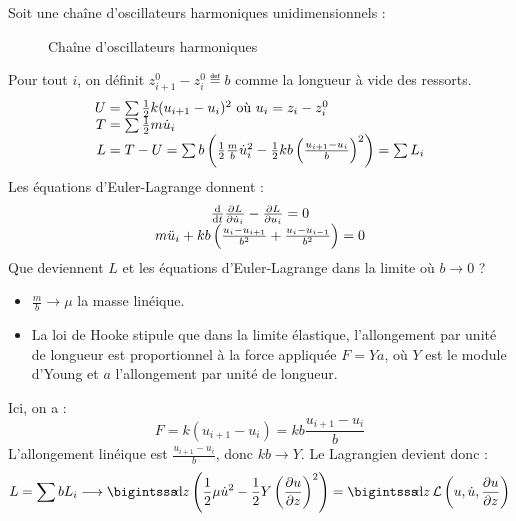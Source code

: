 Soit une cha\^ine d'oscillateurs harmoniques unidimensionnels :
\begin{figure}[H]
\centering
{}
\caption*{Chaîne d'oscillateurs harmoniques}
\end{figure}

Pour tout $i$, on définit $z_{i+1}^0-z_i^0\eqdef b$ comme la longueur à vide des ressorts.
$$
	\begin{array}{r@{\;}l}
		U&=\sum \frac{1}{2}k(u_{i+1}-u_i)^2 \text{ où } u_i=z_i-z_i^0\\
		T&=\sum \frac{1}{2}m\dot{u}_i\\
		L&=T-U=\sum b\left(\frac{1}{2}\frac{m}{b}\dot{u}_i^2-\frac{1}{2}kb\left(\frac{u_{i+1}-u_i}{b}\right)^2\right)=\sum L_i
	\end{array}
$$
Les équations d'Euler-Lagrange donnent :
$$
	\begin{array}{c}
		\frac{\mathrm{d} }{\mathrm{d} t}\frac{\partial L}{\partial \dot{u}_i}-\frac{\partial L}{\partial u_i}=0\\
		m\ddot{u}_i+kb\left(\frac{u_i-u_{i+1}}{b^2}+\frac{u_i-u_{i-1}}{b^2}\right)=0
	\end{array}
$$
Que deviennent $L$ et les équations d'Euler-Lagrange dans la limite où $b\longrightarrow 0$ ?
\begin{itemize}
	\item $\frac{m}{b}\longrightarrow \mu$ la masse linéique.
	\item La loi de Hooke stipule que dans la limite élastique, l'allongement par unité de longueur est proportionnel à la force appliquée $F=Ya$, où $Y$ est le module d'Young et $a$ l'allongement par unité de longueur.
\end{itemize}
Ici, on a :
$$
	F=k(u_{i+1}-u_i)=kb\frac{u_{i+1}-u_i}{b}
$$
L'allongement linéique est $\frac{u_{i+1}-u_i}{b}$, donc $kb\longrightarrow Y$. Le Lagrangien devient donc :
$$
	L=\sum bL_i\longrightarrow\bigintsss \!\dif z\left(\frac{1}{2}\mu \dot{u}^2-\frac{1}{2}Y\left(\frac{\partial u}{\partial z}\right)^2\right) = \bigintsss\!\dif z\,\mathcal{L}\left(u,\dot{u},\frac{\partial u}{\partial z}\right)
$$

